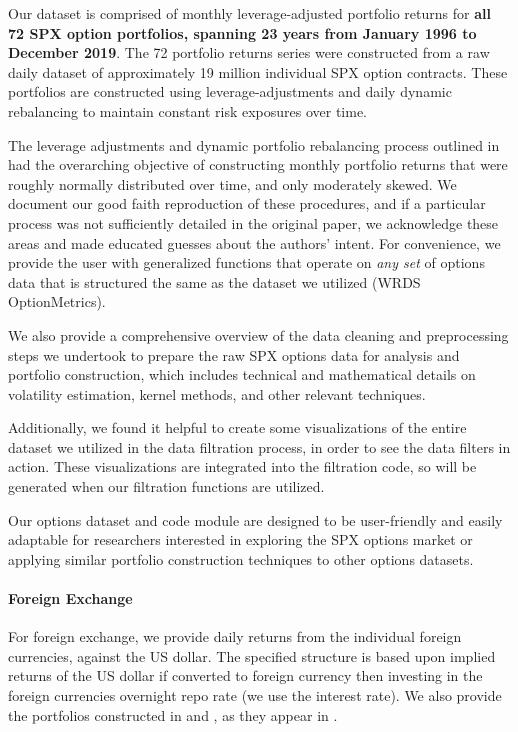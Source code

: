 \documentclass{article}
\begin{document}
Our dataset is comprised of monthly leverage-adjusted portfolio returns for \textbf{all 72 SPX option portfolios, spanning 23 years from January 1996 to December 2019}. The 72 portfolio returns series were constructed from a raw daily dataset of approximately 19 million individual SPX option contracts. These portfolios are constructed using leverage-adjustments and daily dynamic rebalancing to maintain constant risk exposures over time.


The leverage adjustments and dynamic portfolio rebalancing process outlined in \citet{Constantinides2013} had the overarching objective of constructing monthly portfolio returns that were roughly normally distributed over time, and only moderately skewed. We document our good faith reproduction of these procedures, and if a particular process was not sufficiently detailed in the original paper, we acknowledge these areas and made educated guesses about the authors' intent. For convenience, we provide the user with generalized functions that operate on \emph{any set} of options data that is structured the same as the dataset we utilized (WRDS OptionMetrics). 

We also provide a comprehensive overview of the data cleaning and preprocessing steps we undertook to prepare the raw SPX options data for analysis and portfolio construction, which includes technical and mathematical details on volatility estimation, kernel methods, and other relevant techniques.

Additionally, we found it helpful to create some visualizations of the entire dataset we utilized in the data filtration process, in order to see the data filters in action. These visualizations are integrated into the filtration code, so will be generated when our filtration functions are utilized.

Our options dataset and code module are designed to be user-friendly and easily adaptable for researchers interested in exploring the SPX options market or applying similar portfolio construction techniques to other options datasets. 


\paragraph{Foreign Exchange}
For foreign exchange, we provide daily returns from the individual foreign currencies, against the US dollar. 
The specified structure is based upon implied returns of the US dollar if converted to foreign currency then investing 
in the foreign currencies overnight repo rate (we use the interest rate).
We also provide the portfolios constructed in \cite{Lettau2014} and \cite{Menkhoff2012}, as they appear in \cite{He2017}.
\end{document}
